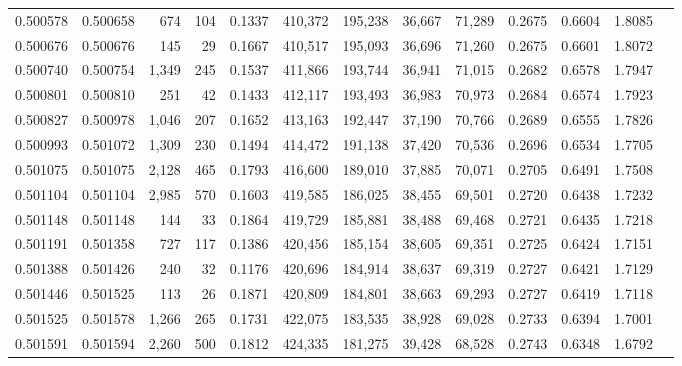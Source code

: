 \begin{tabular}{rrrrrrrrrrrrr}
0.500578 & 0.500658 &   674 &   104 &                                     0.1337 & 410,372 & 195,238 &  36,667 &  71,289 & 0.2675 & 0.6604 & 1.8085 \\
0.500676 & 0.500676 &   145 &    29 &                                     0.1667 & 410,517 & 195,093 &  36,696 &  71,260 & 0.2675 & 0.6601 & 1.8072 \\
0.500740 & 0.500754 & 1,349 &   245 &                                     0.1537 & 411,866 & 193,744 &  36,941 &  71,015 & 0.2682 & 0.6578 & 1.7947 \\
0.500801 & 0.500810 &   251 &    42 &                                     0.1433 & 412,117 & 193,493 &  36,983 &  70,973 & 0.2684 & 0.6574 & 1.7923 \\
0.500827 & 0.500978 & 1,046 &   207 &                                     0.1652 & 413,163 & 192,447 &  37,190 &  70,766 & 0.2689 & 0.6555 & 1.7826 \\
0.500993 & 0.501072 & 1,309 &   230 &                                     0.1494 & 414,472 & 191,138 &  37,420 &  70,536 & 0.2696 & 0.6534 & 1.7705 \\
0.501075 & 0.501075 & 2,128 &   465 &                                     0.1793 & 416,600 & 189,010 &  37,885 &  70,071 & 0.2705 & 0.6491 & 1.7508 \\
0.501104 & 0.501104 & 2,985 &   570 &                                     0.1603 & 419,585 & 186,025 &  38,455 &  69,501 & 0.2720 & 0.6438 & 1.7232 \\
0.501148 & 0.501148 &   144 &    33 &                                     0.1864 & 419,729 & 185,881 &  38,488 &  69,468 & 0.2721 & 0.6435 & 1.7218 \\
0.501191 & 0.501358 &   727 &   117 &                                     0.1386 & 420,456 & 185,154 &  38,605 &  69,351 & 0.2725 & 0.6424 & 1.7151 \\
0.501388 & 0.501426 &   240 &    32 &                                     0.1176 & 420,696 & 184,914 &  38,637 &  69,319 & 0.2727 & 0.6421 & 1.7129 \\
0.501446 & 0.501525 &   113 &    26 &                                     0.1871 & 420,809 & 184,801 &  38,663 &  69,293 & 0.2727 & 0.6419 & 1.7118 \\
0.501525 & 0.501578 & 1,266 &   265 &                                     0.1731 & 422,075 & 183,535 &  38,928 &  69,028 & 0.2733 & 0.6394 & 1.7001 \\
0.501591 & 0.501594 & 2,260 &   500 &                                     0.1812 & 424,335 & 181,275 &  39,428 &  68,528 & 0.2743 & 0.6348 & 1.6792 \\

\end{tabular}
